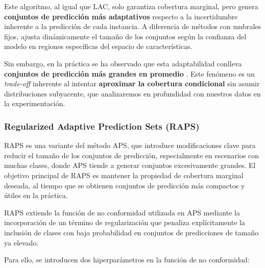 Este algoritmo, al igual que \acrshort{LAC}, solo garantiza cobertura marginal, pero genera \textbf{conjuntos de predicción más adaptativos} respecto a la incertidumbre inherente a la predicción de cada instancia. A diferencia de métodos con umbrales fijos, ajusta dinámicamente el tamaño de los conjuntos según la confianza del modelo en regiones específicas del espacio de características.

Sin embargo, en la práctica se ha observado que esta adaptabilidad conlleva \textbf{conjuntos de predicción más grandes en promedio} \cite{romano2020, angelopoulos2020}. Este fenómeno es un \textit{trade-off} inherente al intentar \textbf{aproximar la cobertura condicional} sin asumir distribuciones subyacente, que analizaremos en profundidad con nuestros datos en la experimentación.


\subsubsection{Regularized Adaptive Prediction Sets (RAPS)}

\acrshort{RAPS} \cite{angelopoulos2020} es una variante del método APS, que introduce modificaciones clave para reducir el tamaño de los conjuntos de predicción, especialmente en escenarios con muchas clases, donde \acrshort{APS} tiende a generar conjuntos excesivamente grandes. El objetivo principal de \acrshort{RAPS} es mantener la propiedad de cobertura marginal deseada, al tiempo que se obtienen conjuntos de predicción más compactos y útiles en la práctica. 

\acrshort{RAPS} extiende la función de no conformidad utilizada en \acrshort{APS} mediante la incorporación de un término de regularización que penaliza explícitamente la inclusión de clases con baja probabilidad en conjuntos de predicciones de tamaño ya elevado. 

Para ello, se introducen dos hiperparámetros en la función de no conformidad:

